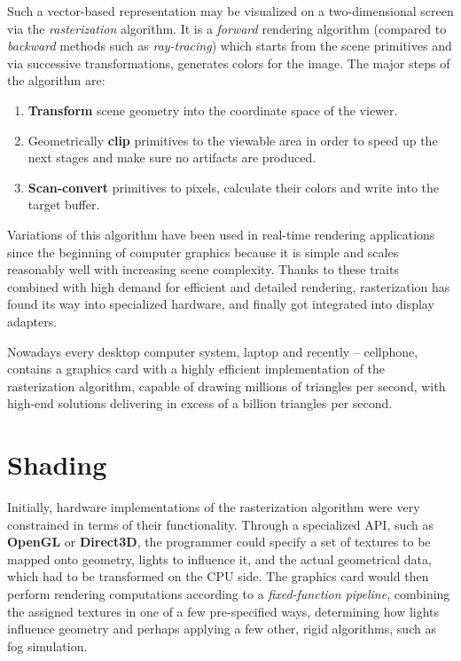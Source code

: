 Such a vector-based representation may be visualized on a two-dimensional screen via the \emph{rasterization} algorithm. It is a \emph{forward} rendering algorithm (compared to \emph{backward} methods such as \emph{ray-tracing}) which starts from the scene primitives and via successive transformations, generates colors for the image. The major steps of the algorithm are:
\begin{enumerate}
\item \textbf{Transform} scene geometry into the coordinate space of the viewer.
\item Geometrically \textbf{clip} primitives to the viewable area in order to speed up the next stages and make sure no artifacts are produced.
\item \textbf{Scan-convert} primitives to pixels, calculate their colors and write into the target buffer.
\end{enumerate}
Variations of this algorithm have been used in real-time rendering applications since the beginning of computer graphics because it is simple and scales reasonably well with increasing scene complexity. Thanks to these traits combined with high demand for efficient and detailed rendering, rasterization has found its way into specialized hardware, and finally got integrated into display adapters.

Nowadays every desktop computer system, laptop and recently -- cellphone, contains a graphics card with a highly efficient implementation of the rasterization algorithm, capable of drawing millions of triangles per second, with high-end solutions delivering in excess of a billion triangles per second.

\section{Shading}

Initially, hardware implementations of the rasterization algorithm were very constrained in terms of their functionality. Through a specialized API, such as \textbf{OpenGL} or \textbf{Direct3D}, the programmer could specify a set of textures to be mapped onto geometry, lights to influence it, and the actual geometrical data, which had to be transformed on the CPU side. The graphics card would then perform rendering computations according to a \emph{fixed-function pipeline}, combining the assigned textures in one of a few pre-specified ways, determining how lights influence geometry and perhaps applying a few other, rigid algorithms, such as fog simulation.

